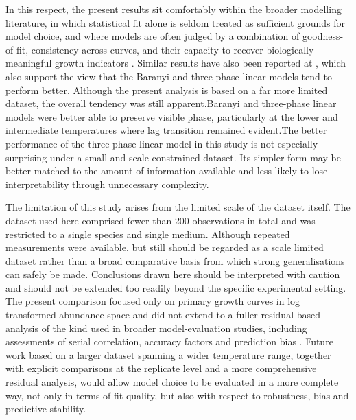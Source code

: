 \documentclass[11pt,onecolumn,draftclsnofoot]{IEEEtran}
\begin{document}
In this respect, the present results sit comfortably within the broader modelling literature, in which statistical fit alone is seldom treated as sufficient grounds for model choice, and where models are often judged by a combination of goodness-of-fit, consistency across curves, and their capacity to recover biologically meaningful growth indicators \cite{LOPEZ2004289}. Similar results have also been reported at \cite{BUCHANAN1997313}, which also  support the view that the Baranyi and three-phase linear models tend to perform better. Although the present analysis is based on a far more limited dataset, the overall tendency was still apparent.Baranyi and three-phase linear models were better able to preserve visible phase, particularly at the lower and intermediate temperatures where lag transition remained evident.The better  performance of the three-phase linear model in this study is not especially surprising under a small and scale constrained dataset. Its simpler form may be better matched to the amount of information available and less likely to lose interpretability through unnecessary complexity.

The limitation of this study arises from the limited scale of the dataset itself. The dataset used here comprised fewer than 200 observations in total and was restricted to a single species and single medium. Although repeated measurements were available, but still should be regarded as a scale limited dataset rather than a broad comparative basis from which strong generalisations can safely be made. Conclusions drawn here should be interpreted with caution and should not be extended too readily beyond the specific experimental setting. The present comparison focused only on primary growth curves in log transformed abundance space and did not extend to a fuller residual based analysis of the kind used in broader model-evaluation studies, including assessments of serial correlation, accuracy factors and prediction bias \cite{LOPEZ2004289}. Future work based on a larger dataset spanning a wider temperature range, together with explicit comparisons at the replicate level and a more comprehensive residual analysis, would allow model choice to be evaluated in a more complete way, not only in terms of fit quality, but also with respect to robustness, bias and predictive stability.
\end{document}
